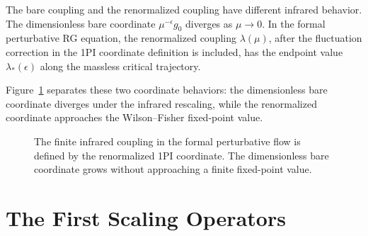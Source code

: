 The bare coupling and the renormalized coupling have different infrared
behavior.  The dimensionless bare coordinate \(\mu^{-\epsilon}g_0\)
diverges as \(\mu\to0\).  In the formal perturbative RG equation, the
renormalized coupling \(\lambda(\mu)\), after the fluctuation correction in
the 1PI coordinate definition is included, has the endpoint value
\(\lambda_*(\epsilon)\) along the massless critical trajectory.

Figure~\ref{fig:volume-ii-bare-versus-renormalized-coupling} separates these two
coordinate behaviors: the dimensionless bare coordinate diverges under the
infrared rescaling, while the renormalized coordinate approaches the
Wilson--Fisher fixed-point value.

\begin{figure}[H]
  \centering
  \caption{The finite infrared coupling in the formal perturbative flow is
  defined by the renormalized 1PI coordinate.  The dimensionless bare
  coordinate grows without approaching a finite fixed-point value.}
  \label{fig:volume-ii-bare-versus-renormalized-coupling}
\end{figure}

\section{The First Scaling Operators}

